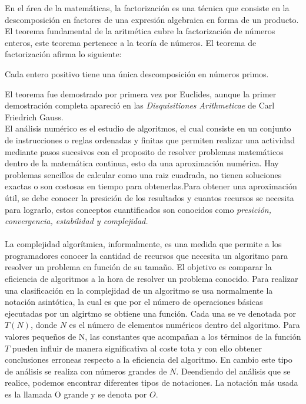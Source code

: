 En el área de la matemáticas, la factorización es una técnica que consiste en la descomposición en factores de una expresión algebraica
en forma de un producto. El teorema fundamental de la aritmética cubre la factorización de números enteros, este teorema pertenece a la teoría
de números. El teorema de factorización afirma lo siguiente:
\begin{teor}
    Cada entero positivo tiene una única descomposición en números primos.
    \label{teo:enterosprimos}
\end{teor}
El teorema fue demostrado por primera vez por Euclides, aunque la primer demostración completa apareció en las \textit{Disquisitiones Arithmeticae}
de Carl Friedrich Gauss.\\
El análisis numérico es el estudio de algoritmos, el cual consiste en un conjunto de instrucciones o reglas ordenadas y finitas que permiten
realizar una actividad mediante pasos sucesivos con el proposito de resolver problemas matemáticos dentro de la matemática continua, esto da 
una aproximación numérica. Hay problemas sencillos de calcular como una raiz cuadrada, no tienen soluciones exactas o son costosas en tiempo
para obtenerlas.Para obtener una aproximación útil, se debe conocer la presición de los resultados y cuantos recursos se necesita para lograrlo, estos conceptos
cuantificados son conocidos como \textit{presición, convergencia, estabilidad y complejidad.}\\\\
La complejidad algorítmica, informalmente, es una medida que permite a los programadores conocer la cantidad de recursos que necesita un algoritmo para resolver un problema en función de su tamaño. El objetivo es
comparar la eficiencia de algoritmos a la hora de resolver un problema conocido\cite{Cohen1998}. Para realizar una clasificación en la complejidad de un algoritmo
se usa normalmente la notación asintótica, la cual es que por el número de operaciones básicas ejecutadas por un algirtmo se obtiene una función. Cada
una se ve denotada por $T(N)$, donde $N$ es el número de elementos numéricos dentro del algoritmo. Para valores pequeños de N, las constantes 
que acompañan a los términos de la función $T$ pueden influir de manera significativa al coste tota y con ello obtener conclusiones erroneas respecto
a la eficiencia del algoritmo. En cambio este tipo de análisis se realiza con números grandes de $N$. Deendiendo del análisis que se realice, podemos
encontrar diferentes tipos de notaciones. La notación más usada es la llamada O grande y se denota por $O$.
